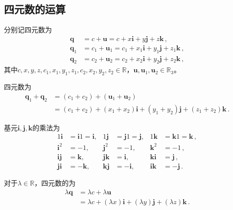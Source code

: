\subsection{四元数的运算}\label{sub:四元数的运算}
分别记四元数为
\begin{align}
    {\bm q}   & =c+{\bm u}=c+x\mathbf{i}+y\mathbf{j}+z\mathbf{k}\, ,             \\
    {\bm q}_1 & =c_1+{\bm u}_1=c_1+x_1\mathbf{i}+y_1\mathbf{j}+z_1\mathbf{k}\, , \\
    {\bm q}_2 & =c_2+{\bm u}_2=c_2+x_2\mathbf{i}+y_2\mathbf{j}+z_2\mathbf{k}\, ,
\end{align}
其中$c,x,y,z,c_1,x_1,y_1,z_1,c_2,x_2,y_2,z_2\in\mathbb{R}$，${\bm u},{\bm u}_1,{\bm u}_2\in\mathbb{R}_3$。
\begin{definition}
    四元数为
    \begin{align}
        {\bm q}_1+{\bm q}_2 & =(c_1+c_2)+({\bm u}_1+{\bm u}_2)\nonumber                                  \\
                            & =(c_1+c_2)+(x_1+x_2)\mathbf{i}+(y_1+y_2)\mathbf{j}+(z_1+z_2)\mathbf{k}\, .
    \end{align}
\end{definition}
\begin{definition}
    基元$\mathbf{i},\mathbf{j},\mathbf{k}$的乘法为
    \begin{align}
        1\mathbf{i}  & =\mathbf{i}1=\mathbf{i}, & 1\mathbf{j}  & =\mathbf{j}1=\mathbf{j}, & 1\mathbf{k}  & =\mathbf{k}1=\mathbf{k}\, , \\
        \mathbf{i}^2 & =-1,                     & \mathbf{j}^2 & =-1,                     & \mathbf{k}^2 & =-1\, ,                     \\
        \mathbf{ij}  & =\mathbf{k},             & \mathbf{jk}  & =\mathbf{i},             & \mathbf{ki}  & =\mathbf{j}\, ,             \\
        \mathbf{ji}  & =-\mathbf{k},            & \mathbf{kj}  & =-\mathbf{i},            & \mathbf{ik}  & =-\mathbf{j}\, .
    \end{align}
\end{definition}
\begin{definition}
    对于$\lambda\in\mathbb{R}$，四元数的为
    \begin{align}
        \lambda{\bm q} & =\lambda c+\lambda {\bm u}\nonumber                                              \\
                       & =\lambda c+(\lambda x)\mathbf{i}+(\lambda y)\mathbf{j}+(\lambda z)\mathbf{k}\, .
    \end{align}
\end{definition}
